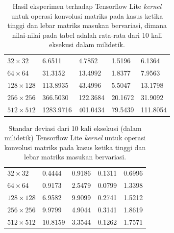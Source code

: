 \begin{table}
	\centering
	\caption{Hasil eksperimen terhadap Tensorflow Lite \textit{kernel} untuk operasi konvolusi matriks pada kasus ketika tinggi dan lebar matriks masukan bervariasi, dimana nilai-nilai pada tabel adalah rata-rata dari 10 kali eksekusi dalam milidetik.}
	\label{tab:convvarhwspeed}
\begin{tabular}{|>{\small}R{2.5cm}|>{\small}R{2.1cm}|>{\small}R{2.1cm}|>{\small}R{2.1cm}|>{\small}R{2.4cm}|}
	\hline
	 & 
	 & 
	 & 
	 & 
	 \\
	\hline
		$32 \times 32$ & 6.6511 & 4.7852 & 1.5196 & 6.1364
		\\
		\hline
		$64 \times 64$ & 31.3152 & 13.4992 & 1.8377 & 7.9563
		\\
		\hline
		$128 \times 128$ & 113.8935 & 43.4996 & 5.5047 & 13.1798
		\\
		\hline
		$256 \times 256$ & 366.5030 & 122.3684 & 20.1672 & 31.9092
		\\
		\hline
		$512 \times 512$ & 1283.9716 & 401.0434 & 79.5439 & 111.8054
		\\
		\hline
	\end{tabular}
\end{table}

\begin{table}
	\centering
	\caption{Standar deviasi dari 10 kali eksekusi (dalam milidetik) Tensorflow Lite \textit{kernel} untuk operasi konvolusi matriks pada kasus ketika tinggi dan lebar matriks masukan bervariasi.}
	\label{tab:convvarhwdev}
\begin{tabular}{|>{\small}R{2.5cm}|>{\small}R{2.1cm}|>{\small}R{2.1cm}|>{\small}R{2.1cm}|>{\small}R{2.4cm}|}
	\hline
	 & 
	 & 
	 & 
	 & 
	 \\
	\hline
		$32 \times 32$ & 0.4444 & 0.9186 & 0.1311 & 0.6996
		\\
		\hline
		$64 \times 64$ & 0.9173 & 2.5479 & 0.0799 & 1.3398
		\\
		\hline
		$128 \times 128$ & 6.9582 & 9.9099 & 0.2741 & 1.5212
		\\
		\hline
		$256 \times 256$ & 9.9799 & 4.9044 & 0.3141 & 1.8619
		\\
		\hline
		$512 \times 512$ & 10.8159 & 3.3544 & 0.1262 & 1.7571
		\\
		\hline
	\end{tabular}
\end{table}

